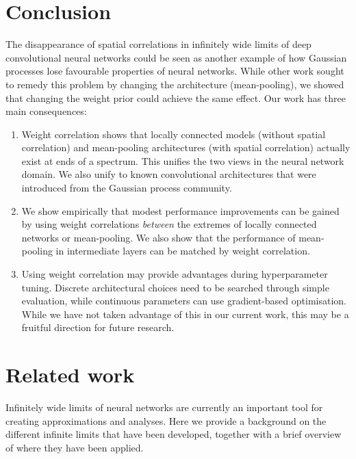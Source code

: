\documentclass[tablecaption=bottom,wcp,nonatbib]{jmlr} %
\begin{document}
\section{Conclusion}
The disappearance of spatial correlations in infinitely wide limits of deep convolutional neural networks could be seen as another example of how Gaussian processes lose favourable properties of neural networks. While other work sought to remedy this problem by changing the architecture (mean-pooling), we showed that changing the weight prior could achieve the same effect. Our work has three main consequences:
\begin{enumerate}
    \item Weight correlation shows that locally connected models (without spatial correlation) and mean-pooling architectures (with spatial correlation) actually exist at ends of a spectrum. This unifies the two views in the neural network domain. We also unify to known convolutional architectures that were introduced from the Gaussian process community.
    \item We show empirically that modest performance improvements can be gained by using weight correlations \emph{between} the extremes of locally connected networks or mean-pooling. We also show that the performance of mean-pooling in intermediate layers can be matched by weight correlation.
    \item Using weight correlation may provide advantages during hyperparameter tuning. Discrete architectural choices need to be searched through simple evaluation, while continuous parameters can use gradient-based optimisation. While we have not taken advantage of this in our current work, this may be a fruitful direction for future research.
\end{enumerate}












\appendix
\section{Related work}
Infinitely wide limits of neural networks are currently an important tool for creating approximations and analyses. Here we provide a background on the different infinite limits that have been developed, together with a brief overview of where they have been applied.
\end{document}
